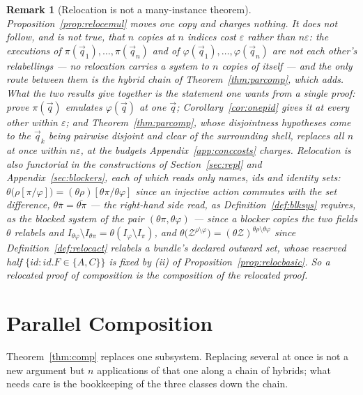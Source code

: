 \documentclass[11pt,a4paper]{article}
\newcommand{\Zenv}{\mathcal{Z}}
\newcommand{\id}{id}
\theoremstyle{accentdef}
\newtheorem{remark}[definition]{Remark}
\theoremstyle{accentplain}
\begin{document}
\begin{remark}[Relocation is not a many-instance theorem]\label{rem:manyinstances}
Proposition~\ref{prop:relocemul} moves one copy and charges nothing. It does not follow, and is not
true, that $n$ copies at $n$ indices cost $\varepsilon$ rather than $n\varepsilon$: the executions
of $\pi(\vec q_1),\ldots,\pi(\vec q_n)$ and of $\varphi(\vec q_1),\ldots,\varphi(\vec q_n)$ are not
each other's relabellings --- no relocation carries a system to $n$ copies of itself --- and the only
route between them is the hybrid chain of
Theorem~\ref{thm:parcomp}, which adds. What the two results give together is the statement one
wants from a single proof: prove $\pi(\vec q)$ emulates $\varphi(\vec q)$ at one $\vec q$;
Corollary~\ref{cor:onepid} gives it at every other within $\varepsilon$; and
Theorem~\ref{thm:parcomp}, whose disjointness hypotheses come to the $\vec q_k$ being pairwise
disjoint and clear of the surrounding shell, replaces all $n$ at once within $n\varepsilon$, at the
budgets Appendix~\ref{app:conccosts} charges. Relocation is also functorial in the constructions of
Section~\ref{sec:repl} and Appendix~\ref{sec:blockers}, each of which reads only names, ids and
identity sets: $\theta\bigl(\rho[\pi/\varphi]\bigr) = (\theta\rho)[\theta\pi/\theta\varphi]$ since an
injective action commutes with the set difference, $\theta\overline{\pi} = \overline{\theta\pi}$ ---
the right-hand side read, as Definition~\ref{def:blksys} requires, as the blocked system of the pair
$(\theta\pi,\theta\varphi)$ --- since a blocker copies the two fields $\theta$ relabels and
$I_{\theta\varphi} \setminus I_{\theta\pi} = \theta(I_\varphi \setminus I_\pi)$, and
$\theta\bigl(\Zenv^{\rho \setminus \varphi}\bigr) = (\theta\Zenv)^{\theta\rho \setminus \theta\varphi}$
since Definition~\ref{def:relocact} relabels a bundle's declared outward set, whose reserved half
$\{\id : \id.F \in \{A,C\}\}$ is fixed by (ii) of Proposition~\ref{prop:relocbasic}. So a relocated
proof of composition is the composition of the relocated proof.
\end{remark}


\section{Parallel Composition}\label{app:parallel}

Theorem~\ref{thm:comp} replaces one subsystem. Replacing several at once is not a new argument
but $n$ applications of that one along a chain of hybrids; what needs care is the bookkeeping of
the three classes down the chain.
\end{document}
